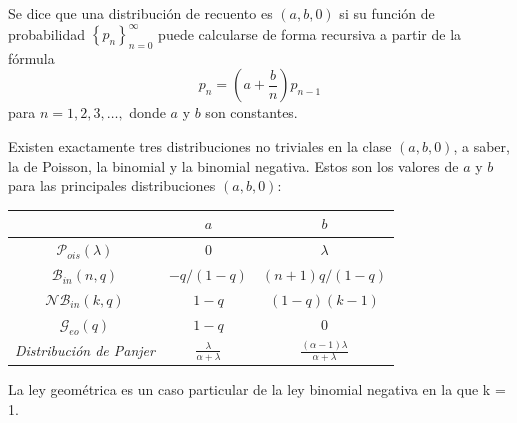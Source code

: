 \begin{f}
	
	Se dice que una distribución de recuento es \((a, b, 0)\) si su función de probabilidad \(\left\{p_{n}\right\}_{n=0}^{\infty}\) puede calcularse de forma recursiva a partir de la fórmula
	\[
	p_{n}=\left(a+\frac{b}{n}\right) p_{n-1}
	\]
	para \(n=1,2,3, \ldots,\) donde \(a\) y \(b\) son constantes.
	
	Existen exactamente tres distribuciones no triviales en la clase \((a, b, 0)\), a saber, la de Poisson, la binomial y la binomial negativa. Estos son los valores de \(a\) y \(b\) para las principales distribuciones \((a, b, 0)\):
	
	\begin{center}
		\begin{tabular}{ccc} 
			& \(a\) & \(b\) \\
			\hline\(\mathcal{P}_{ois}(\lambda)\) & 0 & \(\lambda\) \\
			\(\mathcal{B}_{in}(n, q)\) & \(-q /(1-q)\) & \((n+1) q /(1-q)\) \\
			\(\mathcal{N}\mathcal{B}_{in}(k, q)\) & \(1-q\) & \((1-q)(k-1)\) \\
			\(\mathcal{G}_{eo}( q)\) & \(1-q\) & 0 \\
			\textit{    Distribución de Panjer} & \(\frac{\lambda}{\alpha+\lambda}\) &    \(\frac {(\alpha -1)\lambda }{\alpha +\lambda }\) \\
			\hline 
		\end{tabular}
		
	\end{center}
	
	{\small\color{OrangeProfondIRA} La ley geométrica es un caso particular de la ley binomial negativa en la que k = 1.}
\end{f}

